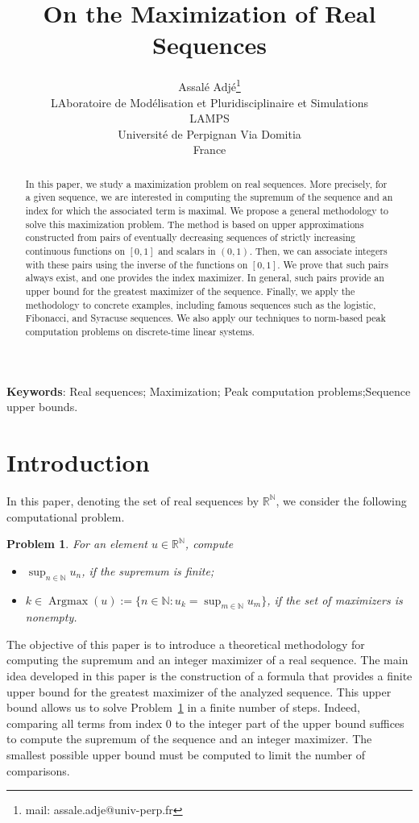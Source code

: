 \documentclass{article}
\title{On the Maximization of Real Sequences}
\author{Assalé Adjé\footnote{mail: assale.adje@univ-perp.fr}\\ LAboratoire de Modélisation et Pluridisciplinaire et Simulations\\
LAMPS\\ Université de Perpignan Via Domitia\\ France
}
\date{}
\def\rr{\mathbb R}
\def\nn{\mathbb N}
\def\agmx{\operatorname{Argmax}}
\newtheorem{prob}{Problem}
\def\blue#1{#1}
\begin{document}
	\maketitle
	
	\begin{abstract}
		In this paper, we study a maximization problem on real sequences. More precisely, for a given sequence, we are interested in computing the supremum of the sequence and an index for which the associated term is maximal. We propose a general methodology to solve this maximization problem. The method is based on upper approximations constructed from pairs of eventually decreasing sequences of strictly increasing continuous functions on $[0,1]$ and scalars in $(0,1)$. Then, we can associate integers with these pairs using the inverse of the functions on $[0,1]$. We prove that such pairs always exist, and one provides the index maximizer. In general, such pairs provide an upper bound for the greatest maximizer of the sequence. Finally, we apply the methodology to concrete examples, including famous sequences such as the logistic, Fibonacci, and Syracuse sequences. We also apply our techniques to norm-based peak computation problems on discrete-time linear systems.   
	\end{abstract}
	
{\bf Keywords}:
		Real sequences; Maximization; Peak computation problems;Sequence upper bounds.
	
	\section{Introduction}
	In this paper, denoting the set of real sequences by $\rr^\nn$, we consider the following computational problem.
	\begin{prob}
		\label{mainpb}
		For an element $u\in\rr^\nn$, compute
		\begin{itemize}
			\item $\displaystyle{\sup_{n\in\nn} u_n}$, \blue{if the supremum is finite};
			\item $\displaystyle{k\in\agmx(u):=\{n\in\nn: u_k=\sup_{m\in\nn} u_m\}}$, \blue{if the set of maximizers is nonempty}.
		\end{itemize}
	\end{prob}
	The objective of this paper is to introduce a theoretical methodology for computing the supremum and an integer maximizer of a real sequence. The main idea developed in this paper is the construction of a formula that provides a finite upper bound for the greatest maximizer of the analyzed sequence. This upper bound allows us to solve Problem~\ref{mainpb} in \blue{a} finite \blue{number of steps}. Indeed, \blue{comparing all terms from index 0 to the integer part of the upper bound suffices} to compute the supremum of the sequence and an integer maximizer. \blue{The smallest possible upper bound must be computed to limit the number of comparisons.}
	
\end{document}
